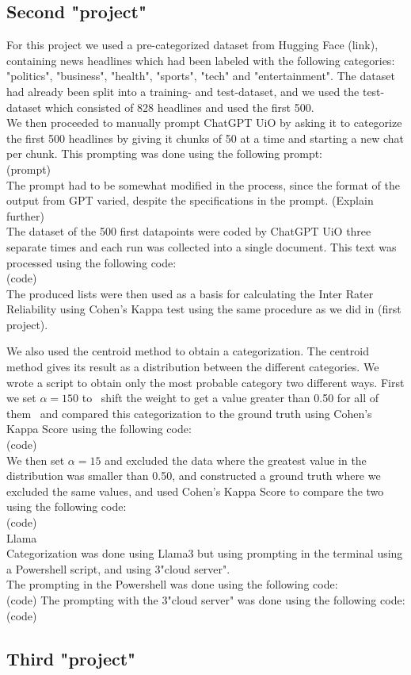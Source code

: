 \begin{flushleft}
\subsection*{Second "project"}
For this project we used a pre-categorized dataset from Hugging Face (link), containing news headlines which had been labeled with the following categories: "politics", "business", "health", "sports", "tech" and "entertainment".
The dataset had already been split into a training- and test-dataset, and we used the test-dataset which consisted of 828 headlines and used the first 500. \\
We then proceeded to manually prompt ChatGPT UiO by asking it to categorize the first 500 headlines by giving it chunks of 50 at a time and starting a new chat per chunk. This prompting 
was done using the following prompt:\\
(prompt)\\
The prompt had to be somewhat modified in the process, since the format of the output from GPT varied, despite the specifications in the prompt. (Explain further)\\[10pt]
The dataset of the 500 first datapoints were coded by ChatGPT UiO three separate times and each run was collected into a single document. This text was processed using the following code:\\
(code)\\
The produced lists were then used as a basis for calculating the Inter Rater Reliability using Cohen's Kappa test using the same procedure as we did in (first project).

We also used the centroid method to obtain a categorization. The centroid method gives its result as a distribution between the different categories. We wrote a script to obtain only the most probable category two different ways.
First we set $\alpha = 150$ to ~shift the weight to get a value greater than 0.50 for all of them~ and compared this categorization to the ground truth using Cohen's Kappa Score using the following code:\\
(code)\\
We then set $\alpha = 15$ and excluded the data where the greatest value in the distribution was smaller than 0.50, and constructed a ground truth where we excluded the same values, 
and used Cohen's Kappa Score to compare the two using the following code:\\
(code)\\

Llama\\
Categorization was done using Llama3 but using prompting in the terminal using a Powershell script, and using 3"cloud server".\\
The prompting in the Powershell was done using the following code:\\
(code)
The prompting with the 3"cloud server" was done using the following code:\\
(code)

\end{flushleft}

\subsection*{Third "project"}

